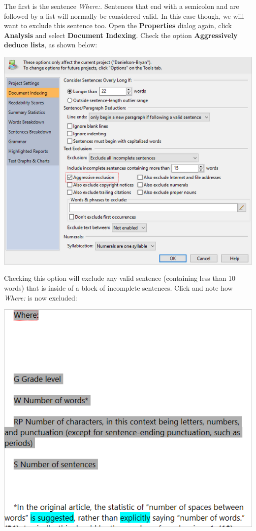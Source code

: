 \documentclass[
]{book}
\theoremstyle{definition}
\theoremstyle{definition}
\theoremstyle{definition}
\theoremstyle{definition}
\theoremstyle{remark}
\begin{document}
The first is the sentence \emph{Where:.} Sentences that end with a semicolon and are followed by a list will normally be considered valid. In this case though, we will want to exclude this sentence too. Open the \textbf{Properties} dialog again, click \textbf{Analysis} and select \textbf{Document Indexing}. Check the option \textbf{Aggressively deduce lists}, as shown below:

\includegraphics{Images/ExclusionExampleAggressiveList.png}

Checking this option will exclude any valid sentence (containing less than 10 words) that is inside of a block of incomplete sentences. Click  and note how \emph{Where:} is now excluded:

\begin{center}\includegraphics[width=0.75\linewidth,]{Images/ExclusionExampleWhereExcluded} \end{center}
\end{document}
